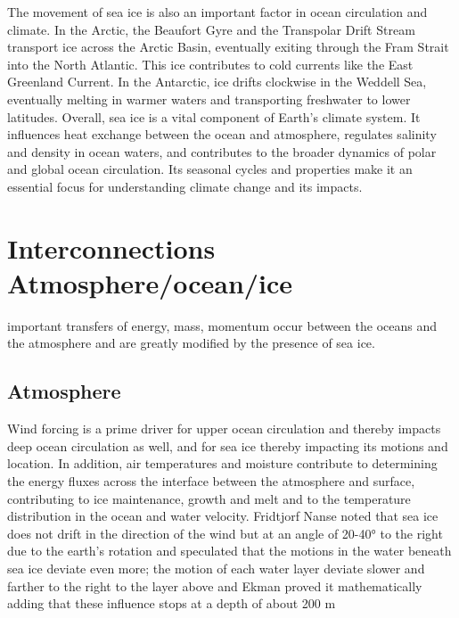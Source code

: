 The movement of sea ice is also an important factor in ocean circulation and climate. In the Arctic, the Beaufort Gyre and the Transpolar Drift Stream transport ice across the Arctic Basin, eventually exiting through the Fram Strait into the North Atlantic. This ice contributes to cold currents like the East Greenland Current. In the Antarctic, ice drifts clockwise in the Weddell Sea, eventually melting in warmer waters and transporting freshwater to lower latitudes.
Overall, sea ice is a vital component of Earth's climate system. It influences heat exchange between the ocean and atmosphere, regulates salinity and density in ocean waters, and contributes to the broader dynamics of polar and global ocean circulation. Its seasonal cycles and properties make it an essential focus for understanding climate change and its impacts.

\section{Interconnections Atmosphere/ocean/ice}
important transfers of energy, mass, momentum occur between the oceans and the atmosphere and are greatly modified by the presence of sea ice.
\subsection{Atmosphere}
Wind forcing is a prime driver for upper ocean circulation and thereby impacts deep ocean circulation as well, and for sea ice thereby impacting its motions and location. In addition, air temperatures and moisture contribute to determining the energy fluxes across the interface between the atmosphere and surface, contributing to ice maintenance, growth and melt and to the temperature distribution in the ocean and water velocity.
Fridtjorf Nanse noted that sea ice does not drift in the direction of the wind but at an angle of 20-40° to the right due to the earth’s rotation and speculated that the motions in the water beneath sea ice deviate even more; the motion of each water layer deviate slower and farther to the right to the layer above and Ekman proved it mathematically adding that these influence stops at a depth of about 200 m

